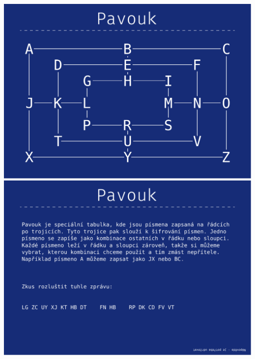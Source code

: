 \documentclass[a4paper]{article}
\begin{document}
	\pagebreak
	\noindent
	\includegraphics[width=\textwidth]{ciphers/keys/pavouk_0.pdf}
	\includegraphics[width=\textwidth]{ciphers/keys/pavouk_1.pdf}
\end{document}
